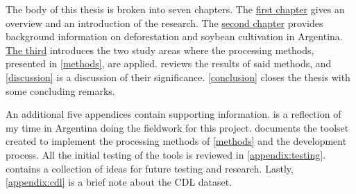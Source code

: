 The body of this thesis is broken into seven chapters. The \hyperref[intro]{first chapter} gives an overview and an introduction of the research. The \hyperref[background]{second chapter} provides background information on deforestation and soybean cultivation in Argentina. \hyperref[studyareas]{The third} introduces the two study areas where the processing methods, presented in \cref{methods}, are applied.  reviews the results of said methods, and \cref{discussion} is a discussion of their significance. \cref{conclusion} closes the thesis with some concluding remarks.

An additional five appendices contain supporting information.  is a reflection of my time in Argentina doing the fieldwork for this project.  documents the toolset created to implement the processing methods of \cref{methods} and the development process. All the initial testing of the tools is reviewed in \cref{appendix:testing}.  contains a collection of ideas for future testing and research. Lastly, \cref{appendix:cdl} is a brief note about the CDL dataset.
